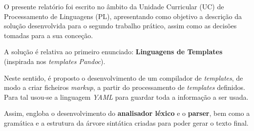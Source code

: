 \documentclass[../relatorio.tex]{subfiles}
\begin{document}
O presente relatório foi escrito no âmbito da Unidade Curricular (UC) de Processamento de Linguagens (PL), apresentando 
como objetivo a descrição da solução desenvolvida para o segundo trabalho prático, assim como as decisões 
tomadas para a sua conceção.

A solução é relativa ao primeiro enunciado: \textbf{Linguagens de Templates} 
(inspirada nos \textit{templates Pandoc}).

Neste sentido, é proposto o desenvolvimento de um compilador de \textit{templates},
de modo a criar ficheiros \textit{markup}, a partir do processamento de
\textit{templates} definidos. 
Para tal usou-se a linguagem \textit{YAML} para guardar toda a 
informação a ser usada.

Assim, engloba o desenvolvimento do \textbf{analisador léxico} e o \textbf{parser}, 
bem como a gramática e a estrutura da árvore sintática criadas  
para poder gerar o texto final. 
\end{document}
